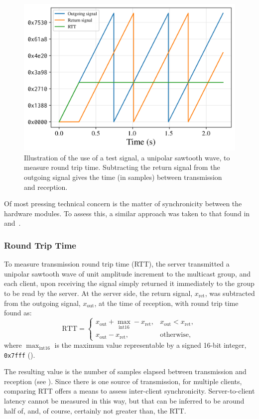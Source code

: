 \begin{figure}[ht]
    \centering
    \includegraphics[width=.5\textwidth]{figures/test-signal}
    \caption{
        Illustration of the use of a test signal, a unipolar sawtooth wave,
        to measure round trip time.
        Subtracting the return signal from the outgoing signal gives the time
        (in samples) between transmission and reception.
    }
    \label{fig:test-signal}
\end{figure}
\noindent
Of most pressing technical concern is the matter of synchronicity between the
hardware modules.
To assess this, a similar approach was taken to that found
in~\citep{rushton_microcontroller-based_2023}
and~\citep{gabrielli_networked_2012}.

\subsubsection{Round Trip Time}
To measure transmission round trip time (RTT), the server transmitted a unipolar
sawtooth wave of unit amplitude increment to the multicast group, and each
client, upon receiving the signal simply returned it immediately to the group to
be read by the server.
At the server side, the return signal, $x_{\text{ret}}$, was subtracted from the
outgoing signal, $x_{\text{out}}$, at the time of reception, with round trip
time found as:
\begin{equation}
    \label{eq:rtt}
    \text{RTT} = \begin{cases}
                     x_{\text{out}} + \max_{\text{int16}} - x_{\text{ret}}, &x_{\text{out}} < x_{\text{ret}}, \\
                     x_{\text{out}} - x_{\text{ret}}, &\text{otherwise},
    \end{cases}
\end{equation}
where $\max_{\text{int16}}$ is the maximum value representable by a
signed 16-bit integer, \texttt{0x7fff} ().

The resulting value is the number of samples elapsed between transmission and
reception (see ).
Since there is one source of transmission, for multiple clients, comparing RTT
offers a means to assess inter-client synchronicity.
Server-to-client latency cannot be measured in this way, but that can be
inferred to be around half of, and, of course, certainly not greater than, the
RTT.\

